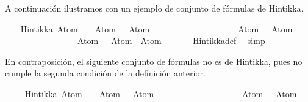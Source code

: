 \begin{isabellebody}
\begin{isamarkuptext}%
A continuación ilustramos con un ejemplo de conjunto de fórmulas
  de Hintikka.%
\end{isamarkuptext}\isamarkuptrue%
\isamarkupfalse%
\isanewline
{}\isanewline
%
\isadelimproof
\isanewline
\ \ %
\endisadelimproof
%
\isatagproof
{}\isamarkupfalse%
\ {\isachardoublequoteopen}Hintikka\ {\isacharbraceleft}Atom\ {}\ \isactrlbold {\isasymand}\ {\isacharparenleft}{\isacharparenleft}\isactrlbold {\isasymnot}\ {\isacharparenleft}Atom\ {}{\isacharparenright}{\isacharparenright}\ \isactrlbold {\isasymrightarrow}\ Atom\ {}{\isacharparenright}{\isacharcomma}\ \isanewline
\ \ \ \ \ \ \ \ \ \ \ \ \ \ \ \ \ {\isacharparenleft}{\isacharparenleft}\isactrlbold {\isasymnot}\ {\isacharparenleft}Atom\ {}{\isacharparenright}{\isacharparenright}\ \isactrlbold {\isasymrightarrow}\ Atom\ {}{\isacharparenright}{\isacharcomma}\ \isanewline
\ \ \ \ \ \ \ \ \ \ \ \ \ \ \ \ \ Atom\ {}{\isacharcomma}\ \isactrlbold {\isasymnot}{\isacharparenleft}\isactrlbold {\isasymnot}\ {\isacharparenleft}Atom\ {}{\isacharparenright}{\isacharparenright}{\isacharcomma}\ Atom\ {}{\isacharbraceright}{\isachardoublequoteclose}\isanewline
\ \ \ \ \isamarkupfalse%
\ Hintikka{\isacharunderscore}def\ \isamarkupfalse%
\ simp%
\endisatagproof
{\isafoldproof}%
%
\isadelimproof
\isanewline
%
\endisadelimproof
\isanewline
{}\isamarkupfalse%
%
\begin{isamarkuptext}%
En contraposición, el siguiente conjunto de fórmulas no es
  de Hintikka, pues no cumple la segunda condición de la definición 
  anterior.%
\end{isamarkuptext}\isamarkuptrue%
\isamarkupfalse%
\isanewline
{}\isanewline
%
\isadelimproof
\isanewline
\ \ %
\endisadelimproof
%
\isatagproof
{}\isamarkupfalse%
\ {\isachardoublequoteopen}{\isasymnot}\ Hintikka\ {\isacharbraceleft}Atom\ {}\ \isactrlbold {\isasymand}\ {\isacharparenleft}{\isacharparenleft}\isactrlbold {\isasymnot}\ {\isacharparenleft}Atom\ {}{\isacharparenright}{\isacharparenright}\ \isactrlbold {\isasymrightarrow}\ Atom\ {}{\isacharparenright}{\isacharcomma}\ \isanewline
\ \ \ \ \ \ \ \ \ \ \ \ \ \ \ \ \ {\isacharparenleft}{\isacharparenleft}\isactrlbold {\isasymnot}\ {\isacharparenleft}Atom\ {}{\isacharparenright}{\isacharparenright}\ \isactrlbold {\isasymrightarrow}\ Atom\ {}{\isacharparenright}{\isacharcomma}\ \isanewline

\end{isabellebody}
